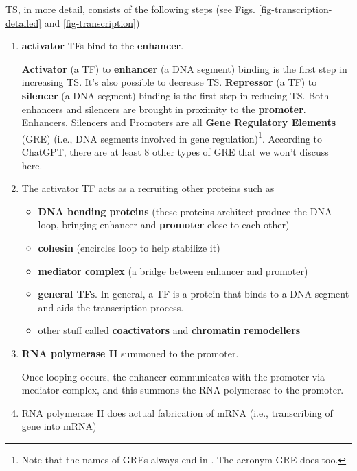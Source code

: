 TS, in more detail, consists
of the following steps (see Figs.
\ref{fig-transcription-detailed}
and \ref{fig-transcription})

\begin{enumerate}
\item {\bf activator}  TFs  bind to the {\bf enhancer}.

{\bf Activator} (a TF) to {\bf enhancer} (a DNA segment)  binding
is the first step in 
increasing TS.
It's also possible to decrease TS.
{\bf Repressor} (a TF) to {\bf silencer} (a DNA segment) binding  is the first step in reducing TS.
Both enhancers and silencers
are brought in
proximity to the {\bf promoter}. 
Enhancers, Silencers and Promoters  are all {\bf Gene Regulatory Elements} (GRE) (i.e., DNA segments
involved in gene regulation)\footnote{Note that the names of GREs always end in . The acronym GRE does too.}. According to
ChatGPT, there are at least 8 other types of GRE  that we won't discuss here.

\item The activator TF 
acts as a  recruiting other 
proteins such as

\begin{itemize}[\checkmark]
\item {\bf DNA bending proteins} (these proteins
architect produce the DNA loop,
bringing  enhancer and {\bf promoter} close to each other)
\item {\bf cohesin} (encircles loop to help stabilize it)
\item {\bf mediator complex} (a bridge between enhancer and promoter)
\item {\bf general TFs}. In general, a TF is a protein that binds to a DNA segment and aids the transcription process.
\item other stuff called {\bf coactivators} and {\bf chromatin remodellers}
\end{itemize}

\item {\bf RNA polymerase II} summoned to the
promoter.

Once looping occurs, the enhancer communicates with the promoter via mediator
complex, and this summons the RNA polymerase to the promoter.

\item RNA polymerase II does actual fabrication of mRNA (i.e., transcribing of gene into mRNA)
  
\end{enumerate}

